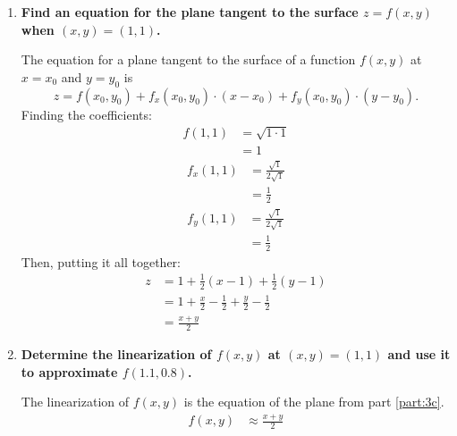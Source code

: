 \documentclass[11pt]{article}
\begin{document}
\begin{enumerate}[label=\textbf{\arabic*.}]
{\begin{enumerate}[label=\textbf{(\alph*)}]
{                }
                \pagebreak
                \item{
                    \label{part:3c}
                    \textbf{\boldmath Find an equation for the plane tangent to the surface \(z=f(x,y)\) when \((x,y)=(1,1)\).}
                    \par
                    The equation for a plane tangent to the surface of a function \(f(x,y)\) at \(x=x_0\) and \(y=y_0\) is
                    \begin{equation*}
                        z=f(x_0,y_0)+f_x(x_0,y_0)\cdot(x-x_0)+f_y(x_0,y_0)\cdot(y-y_0).
                    \end{equation*}
                    Finding the coefficients:
                    \begin{align*}
                        f(1,1)&=\sqrt{1\cdot1} \\
                        &=1
                    \end{align*}
                    \begin{align*}
                        f_x(1,1)&=\frac{\sqrt1}{2\sqrt1} \\
                        &=\frac{1}{2}
                    \end{align*}
                    \begin{align*}
                        f_y(1,1)&=\frac{\sqrt1}{2\sqrt1} \\
                        &=\frac{1}{2}
                    \end{align*}
                    Then, putting it all together:
                    \begin{align*}
                        z&=1+\frac{1}{2}(x-1)+\frac{1}{2}(y-1) \\
                        &=1+\frac{x}{2}-\frac{1}{2}+\frac{y}{2}-\frac{1}{2} \\
                        &=\frac{x+y}{2}
                    \end{align*}
                }
                \item{
                    \textbf{\boldmath Determine the linearization of \(f(x,y)\) at \((x,y)=(1,1)\) and use it to approximate \(f(1.1,0.8)\).}
                    \par
                    The linearization of \(f(x,y)\) is the equation of the plane from part \ref{part:3c}.
                    \begin{align*}
                        f(x,y)&\approx\frac{x+y}{2} \\

\end{align*}}
\end{enumerate}}
\end{enumerate}
\end{document}
